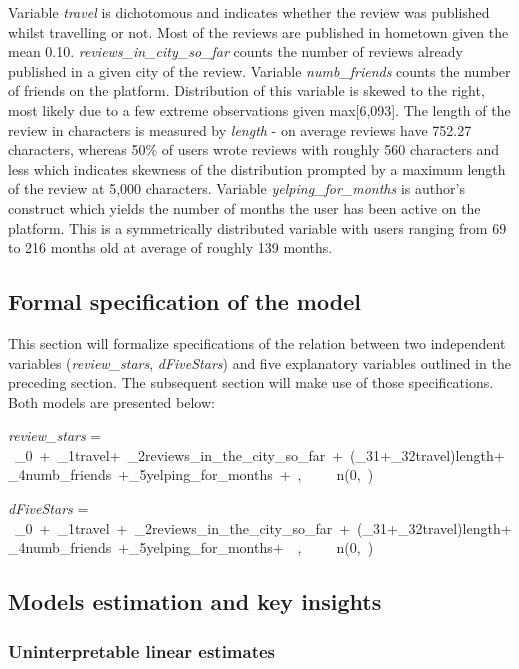 \documentclass{article}
\begin{document}
Variable \textit{travel} is dichotomous and indicates whether the review was published whilst travelling or not. Most of the reviews are published in hometown given the mean 0.10. \textit{reviews\_in\_city\_so\_far} counts the number of reviews already published in a given city of the review. Variable \textit{numb\_friends} counts the number of friends on the platform. Distribution of this variable is skewed to the right, most likely due to a few extreme observations given max[6,093]. The length of the review in characters is measured by \textit{length} - on average reviews have 752.27 characters, whereas 50\% of users wrote reviews with roughly 560 characters and less which indicates skewness of the distribution prompted by a maximum length of the review at 5,000 characters. Variable \textit{yelping\_for\_months} is author's construct which yields the number of months the user has been active on the platform. This is a symmetrically distributed variable with users ranging from 69 to 216 months old at average of roughly 139 months.

\subsection{Formal specification of the model}

This section will formalize specifications of the relation between two independent variables (\textit{review\_stars}, \textit{dFiveStars}) and five explanatory variables outlined in the preceding section. The subsequent section will make use of those specifications. Both models are presented below:

\bigskip

\textit{review\_stars} = \ \beta_0\ +\ \beta_1travel+\ \beta_2reviews\_in\_the\_city\_so\_far\ +\ (\beta_{31}+\beta_{32}travel)length+\beta_4numb\_friends\ +\beta_5yelping\_for\_months\ +\ \varepsilon,\ \ \varepsilon\ ~\ n(0,\ \sigma)

\bigskip

\textit{dFiveStars} = \ \beta_0\ +\ \beta_1travel\ +\ \beta_2reviews\_in\_the\_city\_so\_far\ +\ (\beta_{31}+\beta_{32}travel)length+\beta_4numb\_friends\ +\beta_5yelping\_for\_months+\ \ \varepsilon,\ \ \varepsilon\ ~\ n(0,\ \sigma)
\bigskip

\subsection{Models estimation and key insights}

\subsubsection{Uninterpretable linear estimates}
\end{document}
